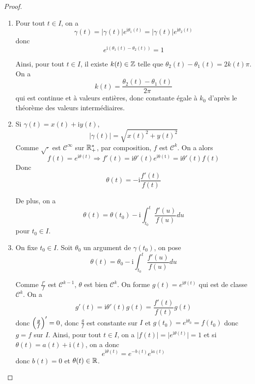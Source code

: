 \documentclass[12pt]{article}
\begin{document}
\begin{proof}
	\phantom{}
	\begin{enumerate}
		\item Pour tout $t\in I$, on a 
		\begin{equation}\gamma(t)=\vert\gamma(t)\vert e^{\mathrm{i}\theta_{1}(t)}=\vert\gamma(t)\vert e^{\mathrm{i}\theta_{2}(t)}\end{equation}
		donc 
		\begin{equation}e^{\mathrm{i}(\theta_{1}(t)-\theta_{2}(t))}=1\end{equation}

		Ainsi, pour tout $t\in I$, il existe $k(t)\in\mathbb{Z}$ telle que $\theta_{2}(t)-\theta_{1}(t)=2k(t)\pi$. On a 
		\begin{equation}k(t)=\frac{\theta_{2}(t)-\theta_{1}(t)}{2\pi}\end{equation}
		qui est continue et à valeurs entières, donc constante égale à $k_{0}$ d'après le théorème des valeurs intermédiaires.

		\item Si $\gamma(t)=x(t)+\mathrm{i}y(t)$, 
		\begin{equation}\vert\gamma(t)\vert=\sqrt{x(t)^{2}+y(t)^{2}}\end{equation}
		Comme $\sqrt{\cdot}$ est $\mathcal{C}^{\infty}$ sur $\mathbb{R}_{+}^{*}$, par composition, $f$ est $\mathcal{C}^{k}$. On a alors
		\begin{equation}f(t)=e^{\mathrm{i}\theta(t)}\Rightarrow f'(t)=\mathrm{i}\theta'(t)e^{\mathrm{i\theta(t)}}=\mathrm{i}\theta'(t)f(t)\end{equation}
		Donc 
		\begin{equation}\theta(t)=-\mathrm{i}\frac{f'(t)}{f(t)}\end{equation}

		De plus, on a 
		\begin{equation}\theta(t)=\theta(t_{0})-\mathrm{i}\int_{t_{0}}^{t}\frac{f'(u)}{f(u)}du\end{equation}
		pour $t_{0}\in I$.

		\item On fixe $t_{0}\in I$. Soit $\theta_{0}$ un argument de $\gamma(t_{0})$, on pose 
		\begin{equation}\theta(t)=\theta_{0}-\mathrm{i}\int_{t_{0}}^{t}\frac{f'(u)}{f(u)}du\end{equation}
		
		Comme $\frac{f'}{f}$ est $\mathcal{C}^{k-1}$, $\theta$ est bien $\mathcal{C}^{k}$. On forme $g(t)=e^{\mathrm{i}\theta(t)}$ qui est de classe $\mathcal{C}^{k}$. On a 
		\begin{equation}g'(t)=\mathrm{i}\theta'(t)g(t)=\frac{f'(t)}{f(t)}g(t)\end{equation}
		donc $\Bigl(\frac{g}{f}\Bigr)'=0$, donc $\frac{g}{f}$ est constante sur $I$ et $g(t_{0})=e^{\mathrm{i}\theta_{0}}=f(t_{0})$ donc $g=f$ sur $I$. Ainsi, pour tout $t\in I$, on a $\vert f(t)\vert=\vert e^{\mathrm{i}\theta(t)}\vert=1$ et si $\theta(t)=a(t)+\mathrm{i}(t)$, on a donc 
		\begin{equation}e^{\mathrm{i}\theta(t)}=e^{-b(t)}e^{\mathrm{i}a(t)}\end{equation}
		donc $b(t)=0$ et $\theta(t)\in\mathbb{R}$.
	\end{enumerate}
\end{proof}
\end{document}
